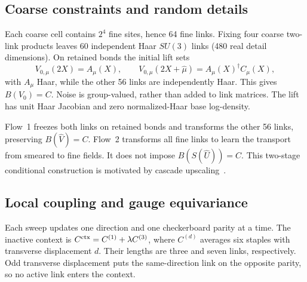 \documentclass[aps,prd,superscriptaddress,nofootinbib,eqsecnum,floatfix,amsmath,longbibliography]{revtex4-2}
\newcommand{\SU}{SU(3)}
\begin{document}
\subsection{Coarse constraints and random details}
Each coarse cell contains $2^4$ fine sites, hence 64 fine links. Fixing four
coarse two-link products leaves 60 independent Haar $\SU$ links
(480 real detail dimensions). On retained bonds the initial lift sets
\begin{equation}
 V_{0,\mu}(2X)=A_\mu(X),\qquad
 V_{0,\mu}(2X+\hat\mu)=A_\mu(X)^\dagger C_\mu(X),
\end{equation}
with $A_\mu$ Haar, while the other 56 links are independently Haar.
This gives $B(V_0)=C$. Noise is group-valued, rather than added to link
matrices. The lift has unit Haar Jacobian and zero normalized-Haar base
log-density.

Flow~1 freezes both links on retained bonds and transforms the other
56 links, preserving $B(\widehat V)=C$. Flow~2 transforms all fine links
to learn the transport from smeared to fine fields. It does not impose
$B(S(\widehat U))=C$. This two-stage conditional construction is motivated
by cascade upscaling~\cite{cascade}.

\subsection{Local coupling and gauge equivariance}
Each sweep updates one direction and one checkerboard parity at a time.
The inactive context is
$C^{\rm ctx}=C^{(1)}+\lambda C^{(3)}$, where $C^{(d)}$ averages six staples
with transverse displacement $d$. Their lengths are three and seven links,
respectively. Odd transverse displacement puts the same-direction link on
the opposite parity, so no active link enters the context.
\end{document}
